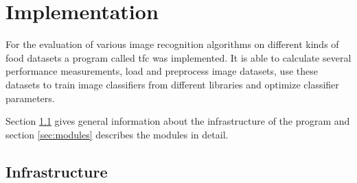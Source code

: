 
\chapter{Implementation}
\label{ch:implementation}
For the evaluation of various image recognition algorithms on different kinds of food datasets a program called \acrfull{tfc} was implemented. It is able to calculate several performance measurements, load and preprocess image datasets, use these datasets to train image classifiers from different libraries and optimize classifier parameters.  

Section \ref{sec:infrastructure} gives general information about the infrastructure of the program and section \ref{sec:modules} describes the modules in detail.


\section{Infrastructure}
\label{sec:infrastructure}

